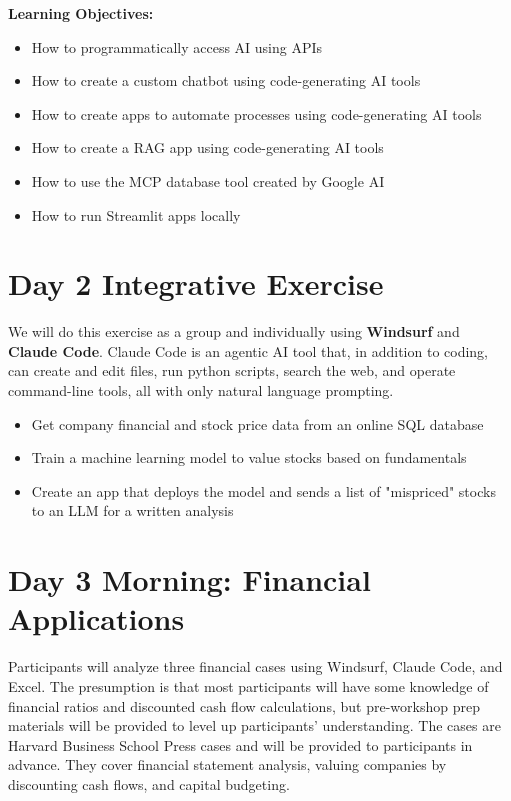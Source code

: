 \documentclass[11pt]{scrartcl}
\begin{document}
\noindent\textbf{Learning Objectives:}

\begin{itemize}
\item How to programmatically access AI using APIs
\item How to create a custom chatbot using code-generating AI tools
\item How to create apps to automate processes using code-generating AI tools
\item How to create a RAG app using code-generating AI tools
\item How to use the MCP database tool created by Google AI
\item How to run Streamlit apps locally
\end{itemize}

\section*{Day 2 Integrative Exercise}

We will do this exercise as a group and individually using \textbf{Windsurf} and \textbf{Claude Code}.  Claude Code is an agentic AI tool that, in addition to coding, can create and edit files, run python scripts, search the web, and operate command-line tools, all with only natural language prompting.

\begin{itemize}
\item Get company financial and stock price data from an online SQL database
\item Train a machine learning model to value stocks based on fundamentals
\item Create an app that deploys the model and sends a list of "mispriced" stocks to an LLM for a written analysis
\end{itemize}

\newpage

\section*{Day 3 Morning: Financial Applications}

Participants will analyze three financial cases using Windsurf, Claude Code, and Excel.   The presumption is that most participants will have some knowledge of financial ratios and discounted cash flow calculations, but pre-workshop prep materials will be provided to level up participants' understanding. The cases are Harvard Business School Press cases and will be provided to participants in advance.  They cover financial statement analysis, valuing companies by discounting cash flows, and capital budgeting.  
  
\end{document}

